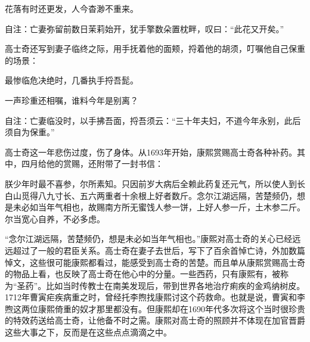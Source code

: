 \begin{bookquote}花落有时还更发，人今杳渺不重来。\end{bookquote}


\begin{bookquote}自注：亡妻弥留前数日茉莉始开，犹手擎数朵置枕畔，叹曰：“此花又开矣。”\end{bookquote}


高士奇还写到妻子临终之际，用手抚着他的面颊，捋着他的胡须，叮嘱他自己保重的场景：



\begin{bookquote}最惨临危决绝时，几番执手捋吾髭。\end{bookquote}


\begin{bookquote}一声珍重还相嘱，谁料今年是别离？\end{bookquote}


\begin{bookquote}自注：亡妻临没时，以手拂吾面，捋吾须云：“三十年夫妇，不道今年永别，此后须自为保重。”\end{bookquote}


高士奇这一年悲伤过度，伤了身体。从1693年开始，康熙赏赐高士奇各种补药。其中，四月给他的赏赐，还附带了一封书信：



\begin{bookquote}朕少年时最不喜参，尔所素知。只因前岁大病后全赖此药复还元气，所以使人到长白山觅得八九寸长、五六两重者十余根上好者数斤。念尔江湖远隔，苦楚频仍，想是未必如当年气相也，故赐南方所无蜜饯人参一饼，上好人参一斤，土木参二斤。尔当宽心自养，不必多虑。\end{bookquote}


“念尔江湖远隔，苦楚频仍，想是未必如当年气相也。”康熙对高士奇的关心已经远远超过了一般的君臣关系。高士奇在妻子去世后，写下了百余首悼亡诗，外加数篇悼文，这些很可能康熙都看过，能感受到高士奇的苦楚。而且单从康熙赏赐高士奇的物品上看，也反映了高士奇在他心中的分量。一些西药，只有康熙有，被称为“圣药”。比如当时传教士在南美发现后，带到世界各地治疗痢疾的金鸡纳树皮。1712年曹寅疟疾病重之时，曾经托李煦找康熙讨这个药救命。也就是说，曹寅和李煦这两位康熙倚重的奴才那里都没有。但康熙却在1690年代多次将这个当时很珍贵的特效药送给高士奇，让他备不时之需。康熙对高士奇的照顾并不体现在加官晋爵这些大事之下，反而是在这些点点滴滴之中。


